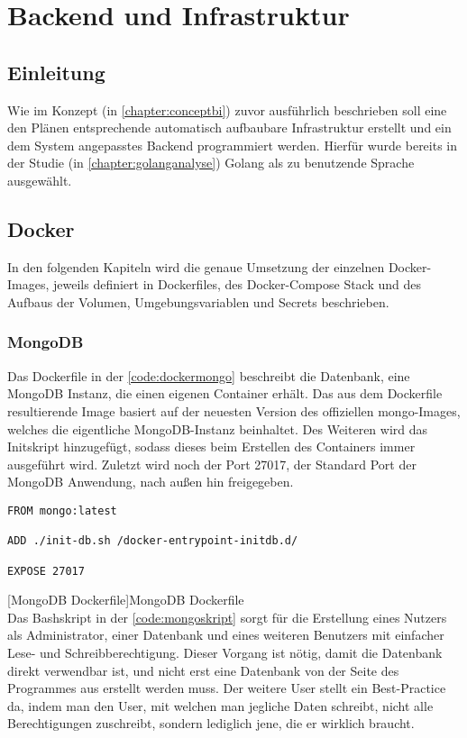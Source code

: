 
\section{Backend und Infrastruktur}

\subsection{Einleitung}
Wie im Konzept (in \autoref{chapter:conceptbi}) zuvor ausführlich beschrieben soll eine den Plänen entsprechende automatisch aufbaubare Infrastruktur erstellt und ein dem System angepasstes Backend programmiert werden. Hierfür wurde bereits in der Studie (in \autoref{chapter:golanganalyse}) Golang als zu benutzende Sprache ausgewählt.
\subsection{Docker}

In den folgenden Kapiteln wird die genaue Umsetzung der einzelnen Docker-Images, jeweils definiert in Dockerfiles, des Docker-Compose Stack und des Aufbaus der Volumen, Umgebungsvariablen und Secrets beschrieben.

\subsubsection{MongoDB}

Das Dockerfile in der \autoref{code:dockermongo} beschreibt die Datenbank, eine MongoDB Instanz, die einen eigenen Container erhält. Das aus dem Dockerfile resultierende Image basiert auf der neuesten Version des offiziellen mongo-Images, welches die eigentliche MongoDB-Instanz beinhaltet. Des Weiteren wird das Initskript hinzugefügt, sodass dieses beim Erstellen des Containers immer ausgeführt wird. Zuletzt wird noch der Port 27017, der Standard Port der MongoDB Anwendung, nach außen hin freigegeben.

\begin{verbatim}
FROM mongo:latest

ADD ./init-db.sh /docker-entrypoint-initdb.d/

EXPOSE 27017
\end{verbatim}
[MongoDB Dockerfile]{MongoDB Dockerfile}
\label{code:dockermongo}
~\\
Das Bashskript in der \autoref{code:mongoskript} sorgt für die Erstellung eines Nutzers als Administrator, einer Datenbank und eines weiteren Benutzers mit einfacher Lese- und Schreibberechtigung. Dieser Vorgang ist nötig, damit die Datenbank direkt verwendbar ist, und nicht erst eine Datenbank von der Seite des Programmes aus erstellt werden muss. Der weitere User stellt ein Best-Practice da, indem man den User, mit welchen man jegliche Daten schreibt, nicht alle Berechtigungen zuschreibt, sondern lediglich jene, die er wirklich braucht. 

